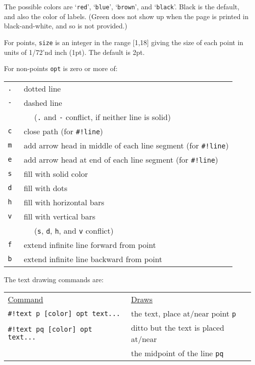 \documentclass[12pt]{article}
\begin{document}
The possible colors
are `{\tt red}', `{\tt blue}', `{\tt brown}', and `{\tt black}'.  Black is
the default, and also the color of labels.
(Green does not show up when the page is printed in black-and-white, and
so is not provided.)

For points, {\tt size} is an integer in the range [1,18] giving the size
of each point in units of 1/72'nd inch (1pt).  The default is 2pt.

\begin{minipage}{\textwidth}
For non-points {\tt opt} is zero or more of:
\\[1ex]
\hspace*{0.5in}\begin{tabular}{rl}
    \tt . & dotted line \\
    \tt - & dashed line \\
          & ~~ ({\tt .} and {\tt -} conflict, if neither line is solid) \\
    \tt c & close path (for {\tt \#!line}) \\
    \tt m & add arrow head in middle of each line segment (for {\tt \#!line}) \\
    \tt e & add arrow head at end of each line segment (for {\tt \#!line}) \\
    \tt s & fill with solid color \\
    \tt d & fill with dots \\
    \tt h & fill with horizontal bars \\
    \tt v & fill with vertical bars \\
          & ~~ ({\tt s}, {\tt d}, {\tt h}, and {\tt v} conflict) \\
    \tt f & extend infinite line forward from point \\
    \tt b & extend infinite line backward from point \\
    \end{tabular}
\end{minipage}

\begin{minipage}{\textwidth}
The text drawing commands are:
\\[1ex]
\begin{tabular}{@{}l@{~~~~~}l@{}}
\underline{Command} & \underline{Draws}
\\[1ex]
\tt \#!text p [color] opt text... &
    the text, place at/near point {\tt p} \\
\tt \#!text pq [color] opt text... &
    ditto but the text is placed at/near \\
    & the midpoint of the line {\tt pq}
\end{tabular}
\end{minipage}
\end{document}
